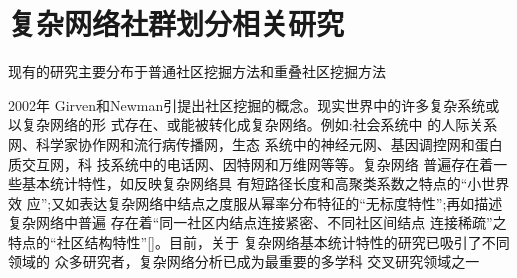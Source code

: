 
\chapter{复杂网络社群划分相关研究}
	现有的研究主要分布于普通社区挖掘方法和重叠社区挖掘方法

2002年 Girven和Newman引提出社区挖掘的概念。现实世界中的许多复杂系统或以复杂网络的形 式存在、或能被转化成复杂网络。例如:社会系统中 的人际关系网、科学家协作网和流行病传播网，生态 系统中的神经元网、基因调控网和蛋白质交互网，科 技系统中的电话网、因特网和万维网等等。复杂网络 普遍存在着一些基本统计特性，如反映复杂网络具 有短路径长度和高聚类系数之特点的“小世界效 应”;又如表达复杂网络中结点之度服从幂率分布特征的“无标度特性”;再如描述复杂网络中普遍 存在着“同一社区内结点连接紧密、不同社区间结点 连接稀疏”之特点的“社区结构特性”[]。目前，关于 复杂网络基本统计特性的研究已吸引了不同领域的 众多研究者，复杂网络分析已成为最重要的多学科 交叉研究领域之一

